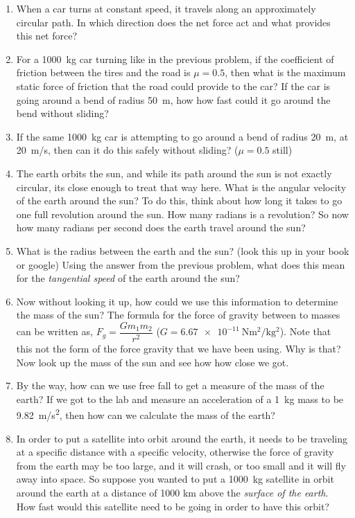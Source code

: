 \begin{enumerate}
	\item When a car turns at constant speed, it travels along an approximately circular path. In which direction does the net force act and what provides this net force?
	
	\item For a \SI{1000}{kg} car turning like in the previous problem, if the coefficient of friction between the tires and the road is $\mu=0.5$, then what is the maximum static force of friction that the road could provide to the car? If the car is going around a bend of radius \SI{50}{\meter}, how how fast could it go around the bend without sliding?
	
	\item If the same \SI{1000}{\kilogram} car is attempting to go around a bend of radius \SI{20}{\meter}, at \SI{20}{m/s}, then can it do this safely without sliding? ($\mu = 0.5$ still)
	
	\item The earth orbits the sun, and while its path around the sun is not exactly circular, its close enough to treat that way here. What is the angular velocity of the earth around the sun? To do this, think about how long it takes to go one full revolution around the sun. How many radians is a revolution? So now how many radians per second does the earth travel around the sun? 
	\item What is the radius between the earth and the sun? (look this up in your book or google) Using the answer from the previous problem, what does this mean for the \emph{tangential speed} of the earth around the sun?
	\item Now without looking it up, how could we use this information to determine the mass of the sun?  The formula for the force of gravity between to masses can be written as, $F_g=\dfrac{G m_1 m_2}{r^2}$ ($G=\SI{6.67e-11}{\newton \meter^2/\kilogram^2}$). Note that this not the form of the force gravity that we have been using. Why is that? Now look up the mass of the sun and see how how close we got.
	\item By the way, how can we use free fall to get a measure of the mass of the earth? If we got to the lab and measure an acceleration of a \SI{1}{\kilogram} mass to be \SI{9.82}{m/s^2}, then how can we calculate the mass of the earth?
	
	\item In order to put a satellite into orbit around the earth, it needs to be traveling at a specific distance with a specific velocity, otherwise the force of gravity from the earth may be too large, and it will crash, or too small and it will fly away into space. So suppose you wanted to put a \SI{1000}{kg} satellite in orbit around the earth at a distance of 1000 km above the \emph{surface of the earth}. How fast would this satellite need to be going in order to have this orbit?
	

\end{enumerate}
